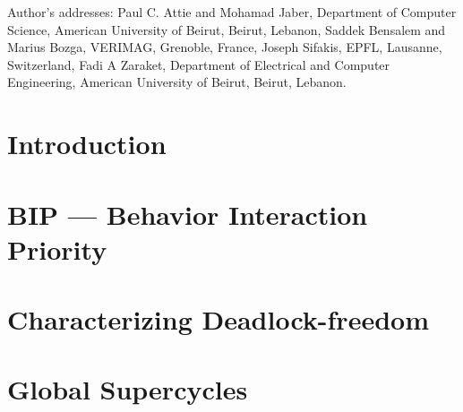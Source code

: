 \documentclass[prodmode,acmtosem]{acmsmall} %
\begin{document}



\begin{bottomstuff}
Author's addresses: Paul C. Attie {and} Mohamad Jaber,
Department of Computer Science, American University of Beirut, Beirut, Lebanon,
Saddek Bensalem and Marius Bozga, VERIMAG, Grenoble, France,
Joseph Sifakis, EPFL, Lausanne, Switzerland, 
Fadi A Zaraket, Department of Electrical and Computer Engineering,
 American University of Beirut, Beirut, Lebanon.
\end{bottomstuff}



\maketitle



\section{Introduction}
\label{s:intro}



\section{BIP --- Behavior Interaction Priority}
\label{s:bip}



\section{Characterizing Deadlock-freedom}
\label{s:characterize}



\section{Global Supercycles}
\label{secn:globalSupercycles}

\end{document}
